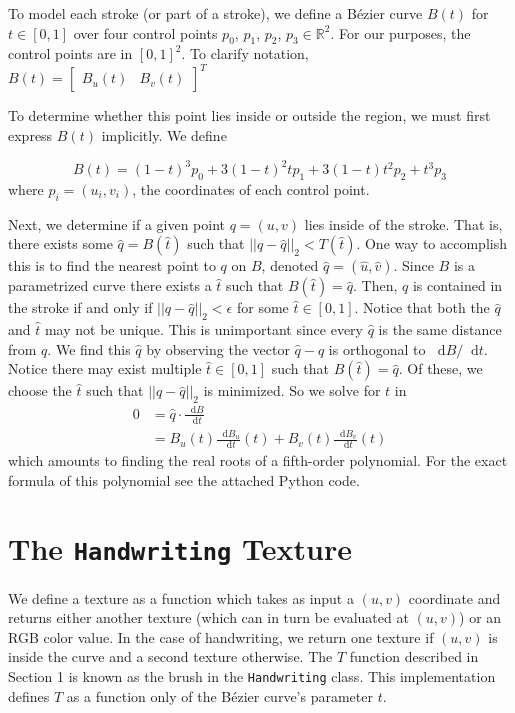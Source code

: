 \documentclass[12pt]{article}
\newcommand*\diff{\mathop{}\!\mathrm{d}}
\begin{document}
To model each stroke (or part of a stroke), we define a B\'ezier curve $B(t)$ for $t \in [0,1]$ over four control points $p_0$, $p_1$, $p_2$, $p_3 \in \mathbb{R}^2$. For our purposes, the control points are in $[0,1]^2$. To clarify notation, $B(t) = \begin{bmatrix} B_u(t) & B_v(t) \end{bmatrix}^T$

To determine whether this point lies inside or outside the region, we must first express $B(t)$ implicitly. We define

\[
	B(t) = (1 - t)^3 p_0 + 3(1 - t)^2 t p_1 + 3(1 - t)t^2 p_2 + t^3 p_3
\]
where $p_i = (u_i, v_i)$, the coordinates of each control point.

Next, we determine if a given point $q = (u,v)$ lies inside of the stroke. That is, there exists some $\hat{q} = B(\hat{t})$ such that $||q - \hat{q}||_2 < T(\hat{t})$. One way to accomplish this is to find the nearest point to $q$ on $B$, denoted $\hat{q} = (\hat{u}, \hat{v})$. Since $B$ is a parametrized curve there exists a $\hat{t}$ such that $B(\hat{t}) = \hat{q}$. Then, $q$ is contained in the stroke if and only if $||q - \hat{q}||_2 < \epsilon$ for some $\hat{t} \in [0,1]$. Notice that both the $\hat{q}$ and $\hat{t}$ may not be unique. This is unimportant since every $\hat{q}$ is the same distance from $q$. We find this $\hat{q}$ by observing the vector $\hat{q} - q$ is orthogonal to $\diff B / \diff t$. Notice there may exist multiple $\hat{t} \in [0,1]$ such that $B(\hat{t}) = \hat{q}$. Of these, we choose the $\hat{t}$ such that $||q - \hat{q}||_2$ is minimized. So we solve for $t$ in
\begin{align*}
 0 &= \hat{q} \cdot \frac{\diff B}{\diff t} \\
  &= B_u(t)\frac{\diff B_u}{\diff t}(t) + B_v(t)\frac{\diff B_v}{\diff t}(t)
\end{align*}
which amounts to finding the real roots of a fifth-order polynomial. For the exact formula of this polynomial see the attached Python code.

\section{The \texttt{Handwriting} Texture}
We define a texture as a function which takes as input a $(u,v)$ coordinate and returns either another texture (which can in turn be evaluated at $(u,v)$) or an RGB color value. In the case of handwriting, we return one texture if $(u,v)$ is inside the curve and a second texture otherwise. The $T$ function described in Section 1 is known as the brush in the \texttt{Handwriting} class. This implementation defines $T$ as a function only of the B\'ezier curve's parameter $t$.
\end{document}
